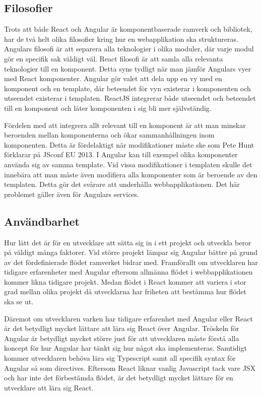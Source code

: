 \subsection{Filosofier}
Trots att både React och Angular är komponentbaserade ramverk och bibliotek, har de två helt olika filosofier kring hur en webapplikation ska struktureras. Angulars filosofi är att separera alla teknologier i olika moduler, där varje modul gör en specifik sak väldigt väl. React filosofi är att samla alla relevanta teknologier till en komponent. Detta syns tydligt när man jämför Angulars vyer med React komponenter. Angular gör valet att dela upp en vy med en komponent och en template, där beteendet för vyn existerar i komponenten och utseendet existerar i templaten. ReactJS integrerar både utseendet och beteendet till en komponent och låter komponenten i sig bli mer självständig. 

Fördelen med att integrera allt relevant till en komponent är att man minskar beroenden mellan komponenterna och ökar sammanhållningen inom komponenten. Detta är fördelaktigt när modifikationer måste ske som Pete Hunt förklarar på JSconf EU 2013.\cite{JSConf} I Angular kan till exempel olika komponenter använda sig av samma template. Vid vissa modifikationer i templaten skulle det innebära att man måste även modifiera alla komponenter som är beroende av den templaten. Detta gör det svårare att underhålla webbapplikationen. Det här problemet gäller även för Angulars services.




\subsection{Användbarhet}
Hur lätt det är för en utvecklare att sätta sig in i ett projekt och utveckla beror på väldigt många faktorer. Vid större projekt lämpar sig Angular bättre på grund av det fördefinierade flödet ramverket bidrar med. Framförallt om utvecklaren har tidigare erfarenheter med Angular eftersom allmänna flödet i webbapplikationen kommer likna tidigare projekt. Medan flödet i React kommer att variera i stor grad mellan olika projekt då utvecklarna har friheten att bestämma hur flödet ska se ut. 

Däremot om utvecklaren varken har tidigare erfarenhet med Angular eller React är det betydligt mycket lättare att lära sig React över Angular. Tröskeln för Angular är betydligt mycket större just för att utvecklaren måste förstå alla koncept för hur Angular har tänkt sig hur något ska implementeras. Samtidigt kommer utvecklaren behöva lära sig Typescript samt all specifik syntax för Angular så som directives. Eftersom React liknar vanlig Javascript tack vare JSX och har inte det förbestämda flödet, är det betydligt mycket lättare för en utvecklare att lära sig React.


